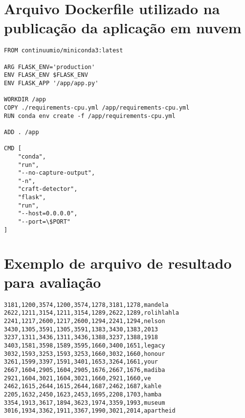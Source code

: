 \begin{apendicesenv}
\chapter{Arquivo Dockerfile utilizado na publicação da aplicação em nuvem}\label{apd:dockerfile}
\begin{verbatim}
FROM continuumio/miniconda3:latest

ARG FLASK_ENV='production'
ENV FLASK_ENV $FLASK_ENV
ENV FLASK_APP '/app/app.py'

WORKDIR /app
COPY ./requirements-cpu.yml /app/requirements-cpu.yml
RUN conda env create -f /app/requirements-cpu.yml

ADD . /app

CMD [
    "conda",
    "run",
    "--no-capture-output",
    "-n",
    "craft-detector",
    "flask",
    "run",
    "--host=0.0.0.0",
    "--port=\$PORT"
]
\end{verbatim}

\chapter{Exemplo de arquivo de resultado para avaliação}\label{apd:exe_resultado}
\begin{verbatim}
3181,1200,3574,1200,3574,1278,3181,1278,mandela
2622,1211,3154,1211,3154,1289,2622,1289,rolihlahla
2241,1217,2600,1217,2600,1294,2241,1294,nelson
3430,1305,3591,1305,3591,1383,3430,1383,2013
3237,1311,3436,1311,3436,1388,3237,1388,1918
3403,1581,3598,1589,3595,1660,3400,1651,legacy
3032,1593,3253,1593,3253,1660,3032,1660,honour
3261,1599,3397,1591,3401,1653,3264,1661,your
2667,1604,2905,1604,2905,1676,2667,1676,madiba
2921,1604,3021,1604,3021,1660,2921,1660,ve
2462,1615,2644,1615,2644,1687,2462,1687,kahle
2205,1632,2450,1623,2453,1695,2208,1703,hamba
3354,1913,3617,1894,3623,1974,3359,1993,museum
3016,1934,3362,1911,3367,1990,3021,2014,apartheid
\end{verbatim}


\end{apendicesenv}
